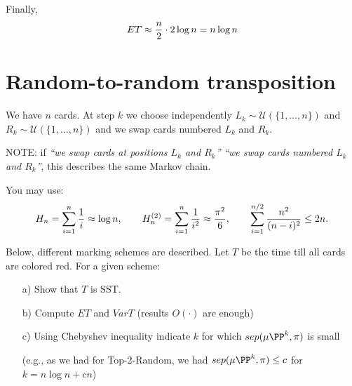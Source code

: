 \documentclass[a4paper,12pt]{article}
\begin{document}
Finally,
$$ET\approx {n\over 2} \cdot 2\log n = n\log n$$


\par \bigskip
\section{Random-to-random transposition}
We have $n$ cards. At step $k$ we choose independently $L_k\sim\mathcal{U}(\{1,\ldots,n\})$ and
 $R_k\sim\mathcal{U}(\{1,\ldots,n\})$ and we swap cards  numbered $L_k$ and $R_k$.
 \medskip\par
 NOTE: if \textsl{``we swap cards  at positions $L_k$ and $R_k$''} \textsl{``we swap cards  numbered $L_k$ and $R_k$''},
 this describes the same Markov chain.

 \medskip\par
 You may use:
 $$H_n=\sum_{i=1}^n {1\over i} \approx \log n ,\qquad H_n^{(2)}=\sum_{i=1}^n {1\over i^2}\approx {\pi^2\over 6},
 \qquad \sum_{i=1}^{n/2}{n^2\over (n-i)^2}\leq 2n.$$

 \medskip\par


Below, different marking schemes are described.  Let $T$ be the time till all cards are colored red.
For a given scheme:
\begin{itemize}
 \item[a)] Show that  $T$ is SST.
 \item[b)] Compute $ET$ and $VarT$ (results $O(\cdot)$ are enough)
 \item[c)] Using Chebyshev inequality indicate $k$ for which $sep(\mu\PP^k,\pi)$ is small\par
 (e.g., as we had for Top-2-Random, we had $sep(\mu\PP^k,\pi)\leq c$ for $k=n\log n+cn$)
\end{itemize}
\end{document}
